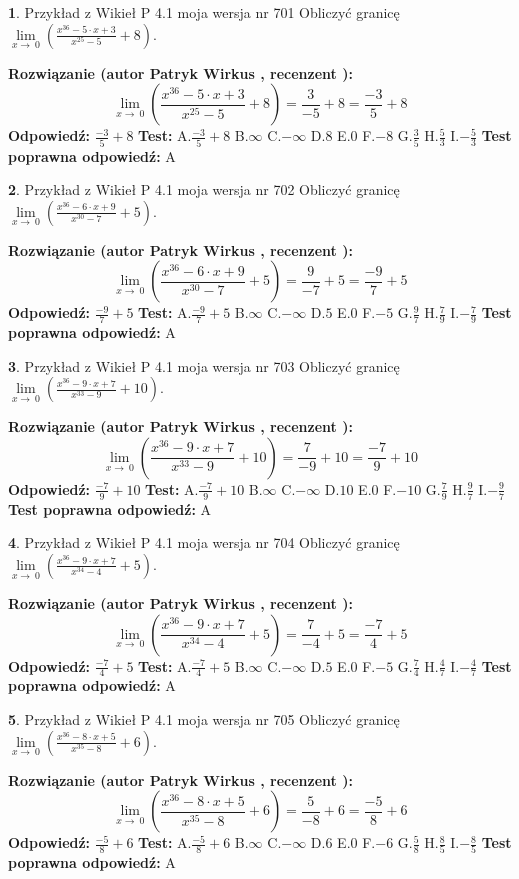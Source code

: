 \documentclass[12pt, a4paper]{article}
\theoremstyle{definition} %
\newtheorem{zad}{}
\newcommand{\zadStart}[1]{\begin{zad}#1\newline}
\newcommand{\zadStop}{\end{zad}}
\newcommand{\rozwStart}[2]{\noindent \textbf{Rozwiązanie (autor #1 , recenzent #2): }\newline}
\newcommand{\rozwStop}{\newline}
\newcommand{\odpStart}{\noindent \textbf{Odpowiedź:}\newline}
\newcommand{\odpStop}{\newline}
\newcommand{\testStart}{\noindent \textbf{Test:}\newline}
\newcommand{\testStop}{\newline}
\newcommand{\kluczStart}{\noindent \textbf{Test poprawna odpowiedź:}\newline}
\newcommand{\kluczStop}{\newline}
\begin{document}
\zadStart{Przykład z Wikieł P 4.1 moja wersja nr 701}
Obliczyć granicę $\lim\limits_{x\to\ 0}(\frac{x^{36}-5 \cdot x +3}{x^{25}-5}+8)$.
\zadStop
\rozwStart{Patryk Wirkus}{}
$$\lim\limits_{x\to\ 0}(\frac{x^{36}-5 \cdot x +3}{x^{25}-5}+8)=\frac{3}{-5}+8=\frac{-3}{5}+8$$
\rozwStop
\odpStart
$\frac{-3}{5}+8$
\odpStop
\testStart
A.$\frac{-3}{5}+8$
B.$\infty$
C.$-\infty$
D.$8$
E.$0$
F.$-8$
G.$\frac{3}{5}$
H.$\frac{5}{3}$
I.$-\frac{5}{3}$
\testStop
\kluczStart
A
\kluczStop



\zadStart{Przykład z Wikieł P 4.1 moja wersja nr 702}
Obliczyć granicę $\lim\limits_{x\to\ 0}(\frac{x^{36}-6 \cdot x +9}{x^{30}-7}+5)$.
\zadStop
\rozwStart{Patryk Wirkus}{}
$$\lim\limits_{x\to\ 0}(\frac{x^{36}-6 \cdot x +9}{x^{30}-7}+5)=\frac{9}{-7}+5=\frac{-9}{7}+5$$
\rozwStop
\odpStart
$\frac{-9}{7}+5$
\odpStop
\testStart
A.$\frac{-9}{7}+5$
B.$\infty$
C.$-\infty$
D.$5$
E.$0$
F.$-5$
G.$\frac{9}{7}$
H.$\frac{7}{9}$
I.$-\frac{7}{9}$
\testStop
\kluczStart
A
\kluczStop



\zadStart{Przykład z Wikieł P 4.1 moja wersja nr 703}
Obliczyć granicę $\lim\limits_{x\to\ 0}(\frac{x^{36}-9 \cdot x +7}{x^{33}-9}+10)$.
\zadStop
\rozwStart{Patryk Wirkus}{}
$$\lim\limits_{x\to\ 0}(\frac{x^{36}-9 \cdot x +7}{x^{33}-9}+10)=\frac{7}{-9}+10=\frac{-7}{9}+10$$
\rozwStop
\odpStart
$\frac{-7}{9}+10$
\odpStop
\testStart
A.$\frac{-7}{9}+10$
B.$\infty$
C.$-\infty$
D.$10$
E.$0$
F.$-10$
G.$\frac{7}{9}$
H.$\frac{9}{7}$
I.$-\frac{9}{7}$
\testStop
\kluczStart
A
\kluczStop



\zadStart{Przykład z Wikieł P 4.1 moja wersja nr 704}
Obliczyć granicę $\lim\limits_{x\to\ 0}(\frac{x^{36}-9 \cdot x +7}{x^{34}-4}+5)$.
\zadStop
\rozwStart{Patryk Wirkus}{}
$$\lim\limits_{x\to\ 0}(\frac{x^{36}-9 \cdot x +7}{x^{34}-4}+5)=\frac{7}{-4}+5=\frac{-7}{4}+5$$
\rozwStop
\odpStart
$\frac{-7}{4}+5$
\odpStop
\testStart
A.$\frac{-7}{4}+5$
B.$\infty$
C.$-\infty$
D.$5$
E.$0$
F.$-5$
G.$\frac{7}{4}$
H.$\frac{4}{7}$
I.$-\frac{4}{7}$
\testStop
\kluczStart
A
\kluczStop



\zadStart{Przykład z Wikieł P 4.1 moja wersja nr 705}
Obliczyć granicę $\lim\limits_{x\to\ 0}(\frac{x^{36}-8 \cdot x +5}{x^{35}-8}+6)$.
\zadStop
\rozwStart{Patryk Wirkus}{}
$$\lim\limits_{x\to\ 0}(\frac{x^{36}-8 \cdot x +5}{x^{35}-8}+6)=\frac{5}{-8}+6=\frac{-5}{8}+6$$
\rozwStop
\odpStart
$\frac{-5}{8}+6$
\odpStop
\testStart
A.$\frac{-5}{8}+6$
B.$\infty$
C.$-\infty$
D.$6$
E.$0$
F.$-6$
G.$\frac{5}{8}$
H.$\frac{8}{5}$
I.$-\frac{8}{5}$
\testStop
\kluczStart
A
\kluczStop
\end{document}
